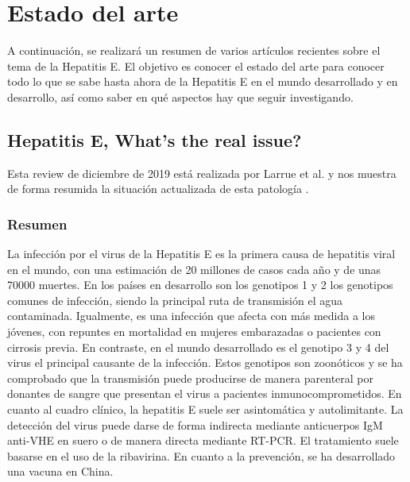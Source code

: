 \documentclass[11 pt]{article}
\begin{document}
\section{Estado del arte}
A continuación, se realizará un resumen de varios artículos recientes sobre el tema de la Hepatitis E. El objetivo es conocer el estado del arte para conocer todo lo que se sabe hasta ahora de la Hepatitis E en el mundo desarrollado y en desarrollo, así como saber en qué aspectos hay que seguir investigando. 
\subsection{Hepatitis E, What's the real issue?}
Esta review de diciembre de 2019 está realizada por Larrue et al. y nos muestra de forma resumida la situación actualizada de esta patología \cite{Larrue2020}.
\subsubsection{Resumen}
La infección por el virus de la Hepatitis E es la primera causa de hepatitis viral en el mundo, con una estimación de 20 millones de casos cada año y de unas 70000 muertes. En los países en desarrollo son los genotipos 1 y 2 los genotipos comunes de infección, siendo la principal ruta de transmisión el agua contaminada. Igualmente, es una infección que afecta con más medida a los jóvenes, con repuntes en mortalidad en mujeres embarazadas o pacientes con cirrosis previa. En contraste, en el mundo desarrollado es el genotipo 3 y 4 del virus el principal causante de la infección. Estos genotipos son zoonóticos y se ha comprobado que la transmisión puede producirse de manera parenteral por donantes de sangre que presentan el virus a pacientes inmunocomprometidos. En cuanto al cuadro clínico, la hepatitis E suele ser asintomática y autolimitante. La detección del virus puede darse de forma indirecta mediante anticuerpos IgM anti-VHE en suero o de manera directa mediante RT-PCR. El tratamiento suele basarse en el uso de la ribavirina. En cuanto a la prevención, se ha desarrollado una vacuna en China.
\end{document}

